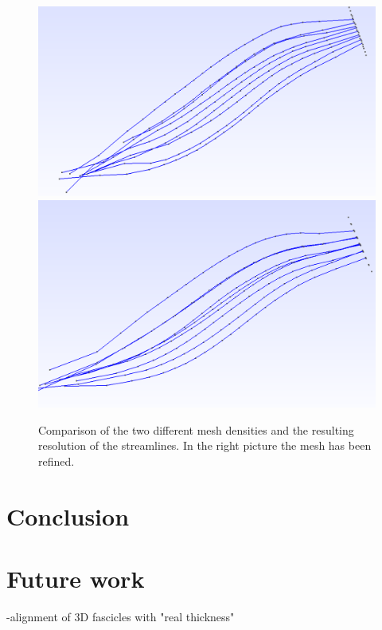 \documentclass[preprint,journal]{vgtc}       %
\begin{document}
\begin{figure}
	
	\begin{minipage}{\linewidth}
		\includegraphics[width=.5\linewidth]{Streamlines.PNG}
		\includegraphics[width=.51\linewidth]{refStreamlines.PNG}
		\caption{Comparison of the two different mesh densities and the resulting resolution of the streamlines. In the right picture the mesh has been refined.}
		\label{fig:refStreamlines}
	\end{minipage}
\end{figure}

\section{Conclusion}


\section{Future work}
-alignment of 3D fascicles with "real thickness"



\end{document}
